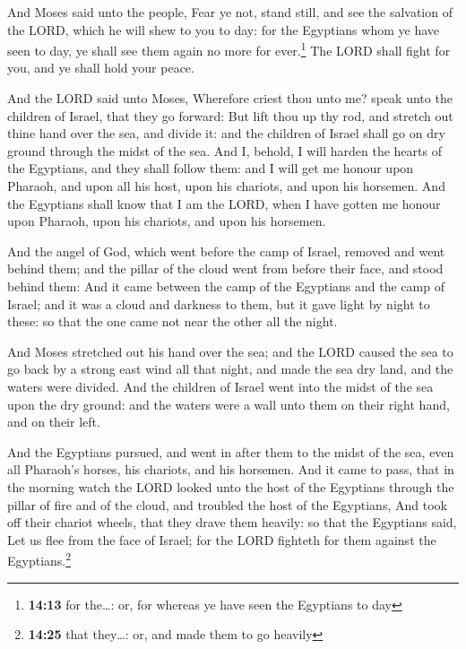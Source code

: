  And Moses said unto the people, Fear ye not, stand
still, and see the salvation of the LORD, which he will shew to you to
day: for the Egyptians whom ye have seen to day, ye shall see them again
no more for ever.\footnote{\textbf{14:13} for the\ldots: or, for whereas
  ye have seen the Egyptians to day}  The LORD shall
fight for you, and ye shall hold your peace.

 And the LORD said unto Moses, Wherefore criest thou unto
me? speak unto the children of Israel, that they go forward:
 But lift thou up thy rod, and stretch out thine hand
over the sea, and divide it: and the children of Israel shall go on dry
ground through the midst of the sea.  And I, behold, I
will harden the hearts of the Egyptians, and they shall follow them: and
I will get me honour upon Pharaoh, and upon all his host, upon his
chariots, and upon his horsemen.  And the Egyptians shall
know that I am the LORD, when I have gotten me honour upon Pharaoh, upon
his chariots, and upon his horsemen.

 And the angel of God, which went before the camp of
Israel, removed and went behind them; and the pillar of the cloud went
from before their face, and stood behind them:  And it
came between the camp of the Egyptians and the camp of Israel; and it
was a cloud and darkness to them, but it gave light by night to these:
so that the one came not near the other all the night.

 And Moses stretched out his hand over the sea; and the
LORD caused the sea to go back by a strong east wind all that night, and
made the sea dry land, and the waters were divided.  And
the children of Israel went into the midst of the sea upon the dry
ground: and the waters were a wall unto them on their right hand, and on
their left.

 And the Egyptians pursued, and went in after them to the
midst of the sea, even all Pharaoh's horses, his chariots, and his
horsemen.  And it came to pass, that in the morning watch
the LORD looked unto the host of the Egyptians through the pillar of
fire and of the cloud, and troubled the host of the Egyptians,
 And took off their chariot wheels, that they drave them
heavily: so that the Egyptians said, Let us flee from the face of
Israel; for the LORD fighteth for them against the Egyptians.\footnote{\textbf{14:25}
  that they\ldots: or, and made them to go heavily}

